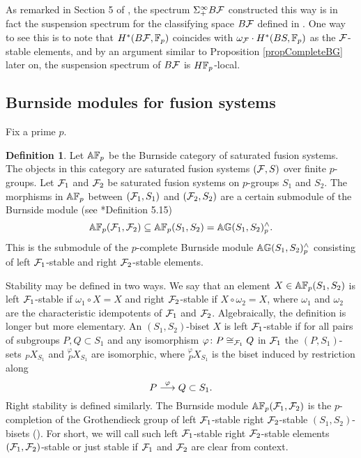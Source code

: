 \documentclass[10pt]{amsart}
\theoremstyle{definition}
\newtheorem{definition}[theorem]{Definition}
\renewcommand{\phi}{\varphi}
\begin{document}
As remarked in Section 5 of \cite{BLO2}, the spectrum $\Sigma^{\infty}_{+} B\mathcal{F}$ constructed this way is in fact the suspension spectrum for the classifying space $B\mathcal{F}$ defined in \cites{BLO2, Chermak}. One way to see this is to note that $H^*(B\mathcal{F},\mathbb{F}_p)$ coincides with $\omega_{\mathcal{F}} \cdot H^*(BS,\mathbb{F}_p)$ as the $\mathcal{F}$-stable elements, and by an argument similar to Proposition \ref{propCompleteBG} later on, the suspension spectrum of $B\mathcal{F}$ is $H\mathbb{F}_p$-local.

\subsection{Burnside modules for fusion systems}

Fix a prime $p$.
\begin{definition}
Let $\mathbb{A} \mathbb{F}_p$ be the Burnside category of saturated fusion systems. The objects in this category are saturated fusion systems $(\mathcal{F},S)$ over finite $p$-groups. Let $\mathcal{F}_1$ and $\mathcal{F}_2$ be saturated fusion systems on $p$-groups $S_1$ and $S_2$. The morphisms in $\mathbb{A} \mathbb{F}_p$ between $(\mathcal{F}_1,S_1)$ and $(\mathcal{F}_2,S_2)$ are a certain submodule of the Burnside module (see \cite{ReehIdempotent}*{Definition 5.15})
\[
\mathbb{A} \mathbb{F}_p(\mathcal{F}_1,\mathcal{F}_2) \subseteq \mathbb{A} \mathbb{F}_p(S_1,S_2) = \mathbb{A} \mathbb{G}(S_1,S_2)^{\wedge}_{p}.
\]
This is the submodule of the $p$-complete Burnside module $\mathbb{A} \mathbb{G}(S_1, S_2)^{\wedge}_{p}$ consisting of left $\mathcal{F}_1$-stable and right $\mathcal{F}_2$-stable elements.
\end{definition}


Stability may be defined in two ways. We say that an element $X \in \mathbb{A} \mathbb{F}_p(S_1, S_2)$ is left $\mathcal{F}_1$-stable if $\omega_1 \circ X = X$ and right $\mathcal{F}_2$-stable if $X \circ \omega_2 = X$, where $\omega_1$ and $\omega_2$ are the characteristic idempotents of $\mathcal{F}_1$ and $\mathcal{F}_2$. Algebraically, the definition is longer but more elementary. An $(S_1,S_2)$-biset $X$ is left $\mathcal{F}_1$-stable if for all pairs of subgroups $P,Q \subset S_1$ and any isomorphism $\phi \colon P \cong_{\cF_1} Q$ in $\mathcal{F}_1$ the $(P,S_1)$-sets ${}_PX_{S_1}$ and ${}_{P}^{\phi}X_{S_1}$ are isomorphic, where ${}_{P}^{\phi}X_{S_1}$ is the biset induced by restriction along
\[
P \lra{\phi} Q \subset S_1.
\]
Right stability is defined similarly. The Burnside module $\mathbb{A} \mathbb{F}_p(\mathcal{F}_1,\mathcal{F}_2)$ is the $p$-completion of the Grothendieck group of left $\mathcal{F}_1$-stable right $\mathcal{F}_2$-stable $(S_1,S_2)$-bisets (\cite[Proposition 4.4]{ReehStableSets}). For short, we will call such left $\mathcal{F}_1$-stable right $\mathcal{F}_2$-stable elements $(\mathcal{F}_1,\mathcal{F}_2)$-stable or just stable if $\mathcal{F}_1$ and $\mathcal{F}_2$ are clear from context.
\end{document}
